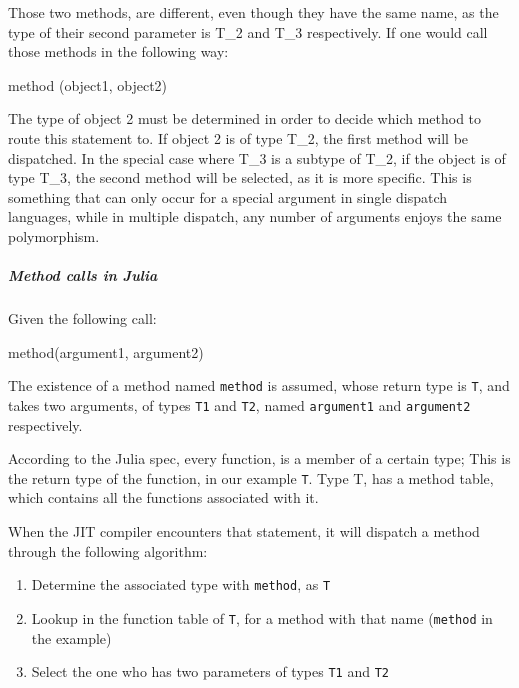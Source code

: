 \documentclass[]{article}
\newenvironment{Shaded}{}{}
\newcommand{\NormalTok}[1]{#1}
\providecommand{\tightlist}{%
  \setlength{\itemsep}{0pt}\setlength{\parskip}{0pt}}
\let\oldsubparagraph\subparagraph
\renewcommand{\subparagraph}[1]{\oldsubparagraph{#1}\mbox{}}
\begin{document}
Those two methods, are different, even though they have the same name,
as the type of their second parameter is T\_2 and T\_3 respectively. If
one would call those methods in the following way:

\begin{Shaded}
\begin{Highlighting}[]
\NormalTok{method (object1, object2)}
\end{Highlighting}
\end{Shaded}

The type of object 2 must be determined in order to decide which method
to route this statement to. If object 2 is of type T\_2, the first
method will be dispatched. In the special case where T\_3 is a subtype
of T\_2, if the object is of type T\_3, the second method will be
selected, as it is more specific. This is something that can only occur
for a special argument in single dispatch languages, while in multiple
dispatch, any number of arguments enjoys the same polymorphism.

\subparagraph{Method calls in Julia}\label{method-calls-in-julia}

Given the following call:

\begin{Shaded}
\begin{Highlighting}[]
\NormalTok{method(argument1, argument2)}
\end{Highlighting}
\end{Shaded}

The existence of a method named \texttt{method} is assumed, whose return
type is \texttt{T}, and takes two arguments, of types \texttt{T1} and
\texttt{T2}, named \texttt{argument1} and \texttt{argument2}
respectively.

According to the Julia spec, every function, is a member of a certain
type; This is the return type of the function, in our example
\texttt{T}. Type T, has a method table, which contains all the functions
associated with it.

When the JIT compiler encounters that statement, it will dispatch a
method through the following algorithm:

\begin{enumerate}
\def\labelenumi{\arabic{enumi}.}
\tightlist
\item
  Determine the associated type with \texttt{method}, as \texttt{T}
\item
  Lookup in the function table of \texttt{T}, for a method with that
  name (\texttt{method} in the example)
\item
  Select the one who has two parameters of types \texttt{T1} and
  \texttt{T2}
\end{enumerate}
\end{document}
